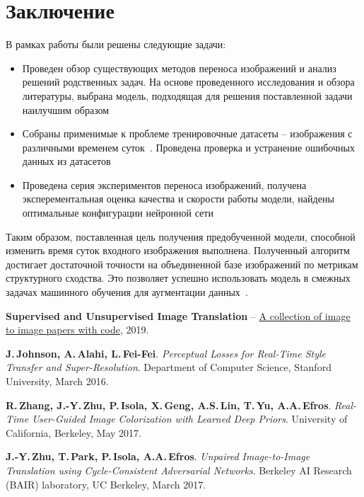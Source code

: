 \documentclass[11pt,a4paper]{extarticle}
\begin{document}
{\newpage
\section{Заключение}\label{sec:conclusion}

	В рамках работы были решены следующие задачи:
	
	\begin{itemize}
		\item Проведен обзор существующих методов переноса изображений и анализ решений родственных задач. На основе проведенного исследования и обзора литературы, выбрана модель, подходящая для решения поставленной задачи наилучшим образом
		\item Собраны применимые к проблеме тренировочные датасеты -- изображения с различными временем суток~\cite{data:nexet,data:bdd100k}. Проведена проверка и устранение ошибочных данных из датасетов
		\item Проведена серия экспериментов переноса изображений, получена эксперементальная оценка качества и скорости работы модели, найдены оптимальные конфигурации нейронной сети
	\end{itemize}
	Таким образом, поставленная цель получения предобученной модели, способной изменить время суток входного изображения выполнена.
	Полученный алгоритм достигает достаточной точности на объединенной базе изображений по метрикам структурного сходства.
	Это позволяет успешно использовать модель в смежных задачах машинного обучения для аугментации данных~\cite{disser_aug}. 

\newpage
\begin{thebibliography}{00}
	
	\textbf{Supervised and Unsupervised Image Translation} --
	\href{https://github.com/lzhbrian/image-to-image-papers}{A collection of image to image papers with code},
	2019.

	\textbf{J.\,Johnson, A.\,Alahi, L.\,Fei-Fei}.
	\emph{Perceptual Losses for Real-Time Style Transfer and Super-Resolution}.
	Department of Computer Science, Stanford University,
	March 2016.

	\textbf{R.\,Zhang, J.-Y.\,Zhu, P.\,Isola, X.\,Geng, A.S.\,Lin, T.\,Yu, A.A.\,Efros}.
	\emph{Real-Time User-Guided Image Colorization with Learned Deep Priors}.
	University of California, Berkeley,
	May 2017.

	\textbf{J.-Y.\,Zhu, T.\,Park, P.\,Isola, A.A.\,Efros}.
	\emph{Unpaired Image-to-Image Translation using Cycle-Consistent Adversarial Networks}.
	Berkeley AI Research (BAIR) laboratory, UC Berkeley,
	March 2017.


\end{thebibliography}}
\end{document}
